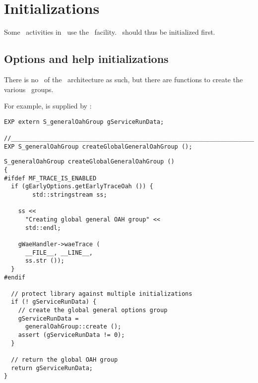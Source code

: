 
\chapter{Initializations}

Some \initialization\ activities in \mf\ use the \oahRepr\ facility. \oahRepr\ should thus be initialized first.


\section{Options and help initializations}

There is no \initialization\  of the \oahRepr\ architecture as such, but there are  functions to create the various \oahRepr\ groups.

For example,  is supplied by : %
\begin{lstlisting}[language=CPlusPlus]
EXP extern S_generalOahGroup gServiceRunData;

//______________________________________________________________________________
EXP S_generalOahGroup createGlobalGeneralOahGroup ();
\end{lstlisting}

\begin{lstlisting}[language=CPlusPlus]
S_generalOahGroup createGlobalGeneralOahGroup ()
{
#ifdef MF_TRACE_IS_ENABLED
  if (gEarlyOptions.getEarlyTraceOah ()) {
		std::stringstream ss;

    ss <<
      "Creating global general OAH group" <<
      std::endl;

    gWaeHandler->waeTrace (
      __FILE__, __LINE__,
      ss.str ());
  }
#endif

  // protect library against multiple initializations
  if (! gServiceRunData) {
    // create the global general options group
    gServiceRunData =
      generalOahGroup::create ();
    assert (gServiceRunData != 0);
  }

  // return the global OAH group
  return gServiceRunData;
}
\end{lstlisting}


